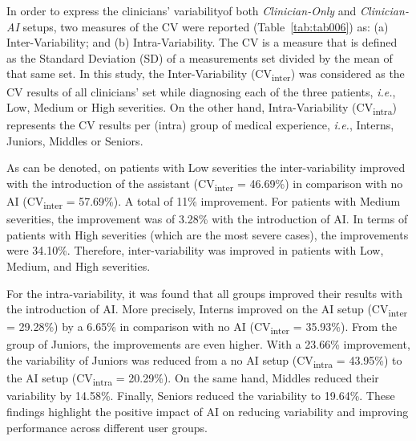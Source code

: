 In order to express the clinicians' variability\footnotemark[26] of both {\it Clinician-Only} and {\it Clinician-AI} setups, two measures of the \acf{CV} were reported (Table~\ref{tab:tab006}) as:
(a) Inter-Variability; and
(b) Intra-Variability.
The \ac{CV} is a measure that is defined as the Standard Deviation (SD) of a measurements set divided by the mean of that same set.
In this study, the Inter-Variability (CV\textsubscript{inter}) was considered as the \ac{CV} results of all clinicians' set while diagnosing each of the three patients, {\it i.e.}, Low, Medium or High severities.
On the other hand, Intra-Variability (CV\textsubscript{intra}) represents the \ac{CV} results per (intra) group of medical experience, {\it i.e.}, Interns, Juniors, Middles or Seniors.




As can be denoted, on patients with Low severities the inter-variability improved with the introduction of the assistant (CV\textsubscript{inter} = 46.69\%) in comparison with no \ac{AI} (CV\textsubscript{inter} = 57.69\%).
A total of 11\% improvement.
For patients with Medium severities, the improvement was of 3.28\% with the introduction of \ac{AI}.
In terms of patients with High severities (which are the most severe cases), the improvements were 34.10\%.
Therefore, inter-variability was improved in patients with Low, Medium, and High severities.

For the intra-variability, it was found that all groups improved their results with the introduction of \ac{AI}.
More precisely, Interns improved on the \ac{AI} setup (CV\textsubscript{inter} = 29.28\%) by a 6.65\% in comparison with no \ac{AI} (CV\textsubscript{inter} = 35.93\%).
From the group of Juniors, the improvements are even higher.
With a 23.66\% improvement, the variability of Juniors was reduced from a no \ac{AI} setup (CV\textsubscript{intra} = 43.95\%) to the \ac{AI} setup (CV\textsubscript{intra} = 20.29\%).
On the same hand, Middles reduced their variability by 14.58\%.
Finally, Seniors reduced the variability to 19.64\%.
These findings highlight the positive impact of \ac{AI} on reducing variability and improving performance across different user groups.

